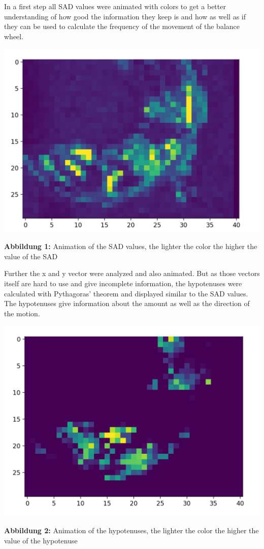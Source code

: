 \documentclass[12pt, a4paper]{report}
\begin{document}
In a first step all SAD values were animated with colors to get a better understanding of how good the information they keep is and how as well as if they can be used to calculate the frequency of the movement of the balance wheel.

\bigskip

\noindent
\begin{center}
\includegraphics[scale=0.6]{Images/animation_sad.png}

{\bf Abbildung 1:}  Animation of the SAD values, the lighter the color the higher the value of the SAD
\end{center}

\bigskip
 
Further the x and y vector were analyzed and also animated. But as those vectors itself are hard to use and give incomplete information, the hypotenuses were calculated with Pythagoras' theorem and displayed similar to the SAD values. The hypotenuses give information about the amount as well as the direction of the motion.
 
 \bigskip

\noindent
\begin{center}
\includegraphics[scale=0.6]{Images/animation_hypotenuse.png}

{\bf Abbildung 2:}  Animation of the hypotenuses, the lighter the color the higher the value of the hypotenuse\end{center}
\end{document}
